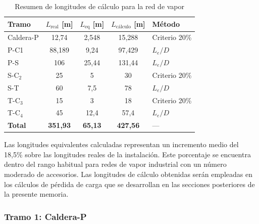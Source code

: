 \documentclass[12pt]{article}
\begin{document}
\begin{table}[H]
	\centering
	\caption{Resumen de longitudes de cálculo para la red de vapor}
	\label{tab:resumen-longitudes-calculo}
	\begin{tabular}{lcccl}
		\toprule
		\textbf{Tramo} & \textbf{$L_{\text{real}}$ [m]} & \textbf{$L_{\text{eq}}$ [m]} & \textbf{$L_{\text{cálculo}}$ [m]} & \textbf{Método} \\
		\midrule
		Caldera-P      & 12,74                          & 2,548                        & 15,288                            & Criterio 20\%   \\
		P-C1        & 88,189                         & 9,24                         & 97,429                            & $L_e/D$         \\
		P-S            & 106                            & 25,44                        & 131,44                            & $L_e/D$         \\
		S-C$_2$        & 25                             & 5                            & 30                                & Criterio 20\%   \\
		S-T            & 60                             & 7,5                          & 78                                & $L_e/D$         \\
		T-C$_3$        & 15                             & 3                            & 18                                & Criterio 20\%   \\
		T-C$_4$        & 45                             & 12,4                         & 57,4                              & $L_e/D$         \\
		\midrule
		\textbf{Total} & \textbf{351,93}                & \textbf{65,13}               & \textbf{427,56}                   & ---             \\
		\bottomrule
	\end{tabular}
\end{table}

Las longitudes equivalentes calculadas representan un incremento medio del 18,5\% sobre las longitudes reales de la instalación. Este porcentaje se encuentra dentro del rango habitual para redes de vapor industrial con un número moderado de accesorios. Las longitudes de cálculo obtenidas serán empleadas en los cálculos de pérdida de carga que se desarrollan en las secciones posteriores de la presente memoria.

\subsubsection{Tramo 1: Caldera-P}
\label{subsubsec:tramo1-caldera-p}
\end{document}
